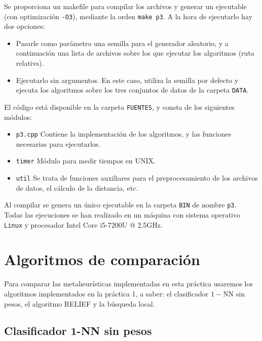 \documentclass[12pt]{article}
\begin{document}
Se proporciona un makefile para compilar los archivos y generar un ejecutable (con optimización \verb|-O3|), mediante la orden \verb|make p3|. A la hora de ejecutarlo hay dos opciones:

\begin{itemize}
    \item Pasarle como parámetro una semilla para el generador aleatorio, y a continuación una lista de archivos sobre los que ejecutar los algoritmos (ruta relativa).
    \item Ejecutarlo sin argumentos. En este caso, utiliza la semilla por defecto y ejecuta los algoritmos sobre los tres conjuntos de datos de la carpeta \verb|DATA|.
\end{itemize}

El código está disponible en la carpeta \verb|FUENTES|, y consta de los siguientes módulos:

\begin{itemize}
	\item \verb|p3.cpp| Contiene la implementación de los algoritmos, y las funciones necesarias para ejecutarlos.
	\item \verb|timer| Módulo para medir tiempos en UNIX.
	\item \verb|util| Se trata de funciones auxiliares para el preprocesamiento de los archivos de datos, el cálculo de la distancia, etc.
\end{itemize}

Al compilar se genera un único ejecutable en la carpeta \verb|BIN| de nombre \verb|p3|.\\

Todas las ejecuciones se han realizado en un máquina con sistema operativo \verb|Linux| y procesador Intel Core i5-7200U @ 2.5GHz.

\newpage
\section{Algoritmos de comparación}

Para comparar las metaheurísticas implementadas en esta práctica usaremos los algoritmos implementados en la práctica 1, a saber: el clasificador $1-$NN sin pesos, el algoritmo RELIEF y la búsqueda local.

\subsection*{{\color{red} Clasificador $\mathbf{1}$-NN sin pesos}}
\end{document}
